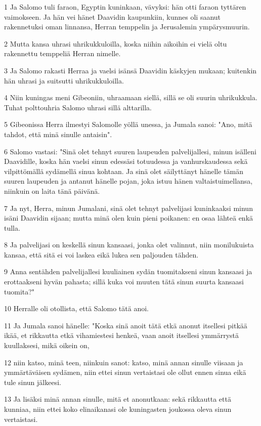 \par 1 Ja Salomo tuli faraon, Egyptin kuninkaan, vävyksi: hän otti faraon tyttären vaimokseen. Ja hän vei hänet Daavidin kaupunkiin, kunnes oli saanut rakennetuksi oman linnansa, Herran temppelin ja Jerusalemin ympärysmuurin.
\par 2 Mutta kansa uhrasi uhrikukkuloilla, koska niihin aikoihin ei vielä oltu rakennettu temppeliä Herran nimelle.
\par 3 Ja Salomo rakasti Herraa ja vaelsi isänsä Daavidin käskyjen mukaan; kuitenkin hän uhrasi ja suitsutti uhrikukkuloilla.
\par 4 Niin kuningas meni Gibeoniin, uhraamaan siellä, sillä se oli suurin uhrikukkula. Tuhat polttouhria Salomo uhrasi sillä alttarilla.
\par 5 Gibeonissa Herra ilmestyi Salomolle yöllä unessa, ja Jumala sanoi: "Ano, mitä tahdot, että minä sinulle antaisin".
\par 6 Salomo vastasi: "Sinä olet tehnyt suuren laupeuden palvelijallesi, minun isälleni Daavidille, koska hän vaelsi sinun edessäsi totuudessa ja vanhurskaudessa sekä vilpittömällä sydämellä sinua kohtaan. Ja sinä olet säilyttänyt hänelle tämän suuren laupeuden ja antanut hänelle pojan, joka istuu hänen valtaistuimellansa, niinkuin on laita tänä päivänä.
\par 7 Ja nyt, Herra, minun Jumalani, sinä olet tehnyt palvelijasi kuninkaaksi minun isäni Daavidin sijaan; mutta minä olen kuin pieni poikanen: en osaa lähteä enkä tulla.
\par 8 Ja palvelijasi on keskellä sinun kansaasi, jonka olet valinnut, niin monilukuista kansaa, että sitä ei voi laskea eikä lukea sen paljouden tähden.
\par 9 Anna sentähden palvelijallesi kuuliainen sydän tuomitakseni sinun kansaasi ja erottaakseni hyvän pahasta; sillä kuka voi muuten tätä sinun suurta kansaasi tuomita?"
\par 10 Herralle oli otollista, että Salomo tätä anoi.
\par 11 Ja Jumala sanoi hänelle: "Koska sinä anoit tätä etkä anonut itsellesi pitkää ikää, et rikkautta etkä vihamiestesi henkeä, vaan anoit itsellesi ymmärrystä kuullaksesi, mikä oikein on,
\par 12 niin katso, minä teen, niinkuin sanot: katso, minä annan sinulle viisaan ja ymmärtäväisen sydämen, niin ettei sinun vertaistasi ole ollut ennen sinua eikä tule sinun jälkeesi.
\par 13 Ja lisäksi minä annan sinulle, mitä et anonutkaan: sekä rikkautta että kunniaa, niin ettei koko elinaikanasi ole kuningasten joukossa oleva sinun vertaistasi.
